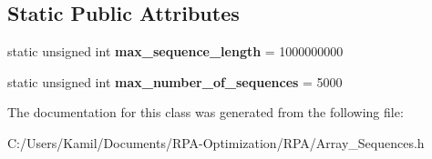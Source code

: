 \subsection*{Static Public Attributes}
\begin{DoxyCompactItemize}
\item 
\mbox{\label{class_array___sequences_a05103713b20762f7e2a4a970a35514f2}} 
static unsigned int {\bfseries max\+\_\+sequence\+\_\+length} = 1000000000
\item 
\mbox{\label{class_array___sequences_a15164d8882eac2d8cf368f74fde967d2}} 
static unsigned int {\bfseries max\+\_\+number\+\_\+of\+\_\+sequences} = 5000
\end{DoxyCompactItemize}


The documentation for this class was generated from the following file\+:\begin{DoxyCompactItemize}
\item 
C\+:/\+Users/\+Kamil/\+Documents/\+R\+P\+A-\/\+Optimization/\+R\+P\+A/Array\+\_\+\+Sequences.\+h\end{DoxyCompactItemize}
